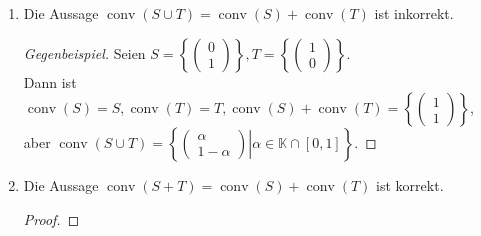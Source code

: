 \documentclass[a4paper,10pt,german]{scrartcl}
\newcommand{\dann}{\ensuremath{\Rightarrow}}
\newcommand{\K}{\ensuremath{\mathbb{K}}}
\newcommand{\N}{\ensuremath{\mathbb{N}}}
\newcommand{\one}{\ensuremath{{\mathds{1}}}}
\newcommand{\divec}[2]{\ensuremath{\left(\begin{array}{cc}
                                    #1\\
                                    #2
                                   \end{array}\right)
                                   }}
\DeclareMathOperator*{\conv}{conv}
\DeclareMathOperator*{\aff}{aff}
\newenvironment{ggbsp}{\begin{proof}[Gegenbeispiel]}{ \end{proof}}
\begin{document}
\begin{enumerate}
\begin{proof}
\begin{itemize}
\begin{align*}
      &x=\sum\limits_{i=1}^k\lambda_i(s_i+t_i)\\
      \dann&\exists k\in\N,\lambda\in \K^k\text{ mit }\lambda^T\one=1, s_1,\dots,s_k\in S,t_1,\dots,t_k\in T:\\
      &x=\sum\limits_{i=1}^k\lambda_is_i+\sum\limits_{i=1}^k\lambda_it_i\\
      \stackrel{\text{Def. }\aff}\dann&\exists s'\in\aff(S),t'\in \aff(T):x=s'+t'\\
      \dann&x\in\aff(S)+\aff(T)
     \end{align*}
    \item[{,,$\supseteq$}'']
     \begin{align*}
      &\text{Sei }x\in\aff(S)+\aff(T)\\
      \dann\exists& k,l\in\N,\alpha\in \K^k,\beta\in\K^l\text{ mit }\alpha^T\one=1,\beta^T\one=1,s_1,\dots,s_k\in S,t_1,\dots,t_l\in T:\\
      x&=\sum\limits_{i=1}^k\alpha_i s_i+\sum\limits_{i=1}^l\beta_i t_i\\
      \intertext{ \footnotesize Sei o.B.d.A.  $k=l$ ($k<l\dann\alpha_{k+1}=\dots=\alpha_l=0, s_{k+1}=\dots=s_l=s_k,\,k>l$ analog).}
      \dann\exists& k\in\N,\alpha,\beta\in \K^k\text{ mit }\alpha^T\one=1,\beta^T\one=1,s_1,\dots,s_k\in S,t_1,\dots,t_k\in T:\\
      x&=\sum\limits_{i=1}^k\alpha_i s_i+\sum\limits_{i=1}^l\beta_i t_i\\
      &=\sum\limits_{i=1}^k\left(-\frac1k(s_i+t_i)+\underbrace{\sum\limits_{j=1}^k\frac{\alpha_i+\beta_j}k(s_i+t_j)}
      _{\text{insges.:\,}\sum\limits_{m=1}^k(\alpha_m+\frac1k)s_m+(\beta_m+\frac1k)t_m}\right)\\
      \intertext{Setze $u_{i,j}:=s_i+t_j \in S+T,\gamma_{i,j}:=\frac{\alpha_i+\beta_j}{k},\delta_i=-\frac1k'\in\K$, wobei gilt:}
      &\ \sum\limits_{i=1}^k\sum\limits_{j=1}^k\gamma_{i,j}+\sum\limits_{i=1}^k\delta_i=\sum\limits_{i=1}^k\left(\alpha_i+\frac1k\right)-1=1+1-1=1\\
      \intertext{Es gilt also:}
      x&=\sum\limits_{i=1}^k\sum\limits_{j=1}^k\gamma_{i,j}u_{i,j}+\sum\limits_{i=1}^k\delta_iu_{i,i}
      \intertext{und dies ist eine affine Kombination aus $S+T$.}
     \end{align*}
   \end{itemize}
  \end{proof}
 \item Die Aussage $\conv(S\cup T)= \conv(S)+\conv(T)$ ist inkorrekt.
  \begin{ggbsp}
   Seien $S=\left\{\divec{0}{1}\right\},T=\left\{\divec{1}{0}\right\}$.\\
   Dann ist $\conv(S)=S,\conv(T)=T,\conv(S)+\conv(T)=\left\{\divec{1}{1}\right\}$,\\
   aber $\conv(S\cup T)=\left.\left\{\divec{\alpha}{1-\alpha}\right|\alpha\in\K\cap[0,1]\right\}$.
  \end{ggbsp}
 \item Die Aussage $\conv(S+T)= \conv(S)+\conv(T)$ ist korrekt.
 \begin{proof}
 

\end{proof}
\end{enumerate}
\end{document}
